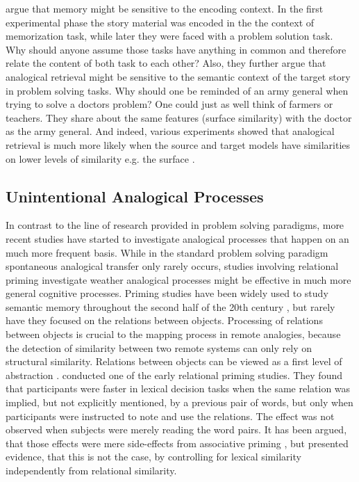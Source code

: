 \documentclass[a4paper,man,natbib,floatsintext,import]{apa6}
\begin{document}

\cite{Gick1980} argue that memory might be sensitive to the encoding context. In the first experimental phase the story material was encoded in the the context of memorization task, while later they were faced with a problem solution task. Why should anyone assume those tasks have anything in common and therefore relate the content of both task to each other? Also, they further argue that analogical retrieval might be sensitive to the semantic context of the target story in problem solving tasks. Why should one be reminded of an army general when trying to solve a doctors problem? One could just as well think of farmers or teachers. They share about the same features (surface similarity) with the doctor as the army general. And indeed, various experiments showed that analogical retrieval is much more likely when the source and target models have similarities on lower levels of similarity e.g. the surface \citep{Gentner1993,Holyoak1987}.

\subsection{Unintentional Analogical Processes}
In contrast to the line of research provided in problem solving paradigms, more recent studies have started to investigate analogical processes that happen on an much more frequent basis. While in the standard problem solving paradigm spontaneous analogical transfer only rarely occurs, studies involving relational priming investigate weather analogical processes might be effective in much more general cognitive processes. Priming studies have been widely used to study semantic memory throughout the second half of the 20th century \citep{Lucas2000}, but rarely have they focused on the relations between objects. Processing of relations between objects is crucial to the mapping process in remote analogies, because the detection of similarity between two remote systems can only rely on structural similarity. Relations between objects can be viewed as a first level of abstraction \cite{Catrambone2002}. \cite{Spellman2001} conducted one of the early relational priming studies. They found that participants were faster in lexical decision tasks when the same relation was implied, but not explicitly mentioned, by a previous pair of words, but only when participants were instructed to note and use the relations. The effect was not observed when subjects were merely reading the word pairs. It has been argued, that those effects were mere side-effects from associative priming \citep{Gagne2005}, but \cite{Estes2006} presented evidence, that this is not the case, by controlling for lexical similarity independently from relational similarity.
\end{document}
